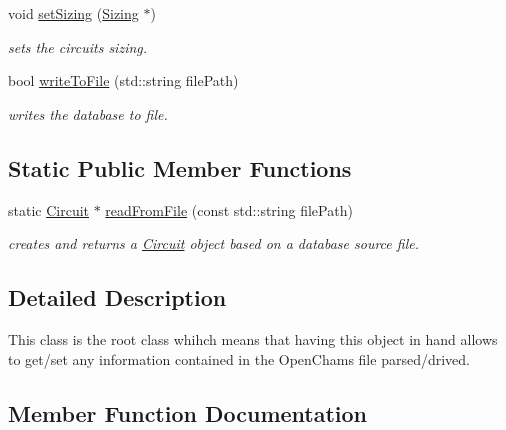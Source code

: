 \begin{DoxyCompactItemize}
void \hyperlink{class_open_chams_1_1_circuit_ab065572c5c1d9beb304324f2d2d8b525}{set\+Sizing} (\hyperlink{class_open_chams_1_1_sizing}{Sizing} $\ast$)
\begin{DoxyCompactList}\small\item\em sets the circuit\textquotesingle{}s sizing. \end{DoxyCompactList}\item 
bool \hyperlink{class_open_chams_1_1_circuit_a2eb07935ec946a07edcee2255b781193}{write\+To\+File} (std\+::string file\+Path)
\begin{DoxyCompactList}\small\item\em writes the database to file. \end{DoxyCompactList}\end{DoxyCompactItemize}
\subsection*{Static Public Member Functions}
\begin{DoxyCompactItemize}
\item 
static \hyperlink{class_open_chams_1_1_circuit}{Circuit} $\ast$ \hyperlink{class_open_chams_1_1_circuit_ad0aa3183bdea59e62f69c295026b7fe7}{read\+From\+File} (const std\+::string file\+Path)
\begin{DoxyCompactList}\small\item\em creates and returns a \hyperlink{class_open_chams_1_1_circuit}{Circuit} object based on a database source file. \end{DoxyCompactList}\end{DoxyCompactItemize}


\subsection{Detailed Description}
This class is the root class whihch means that having this object in hand allows to get/set any information contained in the Open\+Chams file parsed/drived. 

\subsection{Member Function Documentation}
\mbox{\label{class_open_chams_1_1_circuit_a7c1c09f44cf215dc17d3dd2518e32389}} 
